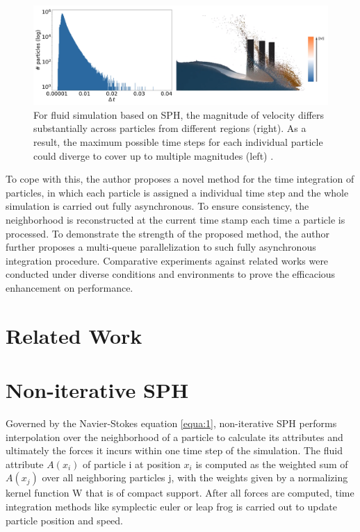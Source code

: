 \documentclass[
	11pt, 
	DIV10,
	ngerman,
	a4paper, 
	oneside, 
	headings=normal, 
	captions=tableheading,
	final, 
	numbers=noenddot
]{scrartcl}
\begin{document}
\begin{figure}[tb]
	\centering
	\includegraphics[scale=0.3]{images/1}
	\caption{
		\label{fig:1} For fluid simulation based on SPH, the magnitude of velocity differs substantially 			across particles from different regions (right). As a result, the maximum possible time steps for each 		individual particle could diverge to cover up to multiple magnitudes (left) \cite{reinhardt2017fully}.
	}
\end{figure}

\par
To cope with this, the author proposes a novel method for the time integration of particles, in which each particle is assigned a individual time step and the whole simulation is carried out fully asynchronous. To ensure consistency, the neighborhood is reconstructed at the current time stamp each time a particle is processed. To demonstrate the strength of the proposed method, the author further proposes a multi-queue parallelization to such fully asynchronous integration procedure. Comparative experiments against related works were conducted under diverse conditions and environments to prove the efficacious enhancement on performance.

\section{Related Work}

\section{Non-iterative SPH}

Governed by the Navier-Stokes equation \ref{equa:1}, non-iterative SPH performs interpolation over the neighborhood of a particle to calculate its attributes and ultimately the forces it incurs within one time step of the simulation. The fluid attribute $ A(x_{i}) $ of particle i at position $ x_{i} $ is computed as the weighted sum of  $ A(x_{j}) $ over all neighboring particles j, with the weights given by a normalizing kernel function W that is of compact support. After all forces are computed, time integration methods like symplectic euler or leap frog is carried out to update particle position and speed.
\end{document}
